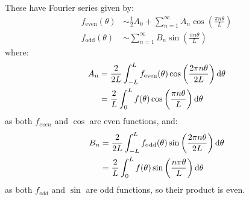 \documentclass[../main.tex]{subfiles}
\begin{document}
These have Fourier series given by:
\begin{align*}
  f_{\text{even}}(\theta) &\sim \frac{1}{2}A_0 + \sum_{n = 1}^{\infty} A_n \cos\left(\frac{\pi n \theta}{L}\right) \\
  f_{\text{odd}}(\theta) &\sim \sum_{n = 1}^{\infty} B_n \sin\left(\frac{\pi n \theta}{L}\right)
\end{align*}
where:
\begin{align*}
  A_n &= \frac{2}{2L} \int_{-L}^{L} f_{\text{even}}(\theta) \cos\left(\frac{2 \pi n \theta}{2L}\right) \d{\theta} \\
      &= \frac{2}{L} \int_{0}^{L} f(\theta) \cos\left(\frac{\pi n \theta}{L}\right) \d{\theta}
\end{align*}
as both $f_{even}$ and $\cos$ are even functions, and:
\begin{align*}
  B_n &= \frac{2}{2L} \int_{-L}^{L} f_{\text{odd}}(\theta) \sin\left(\frac{2 \pi n \theta}{2L}\right) \d{\theta} \\
      &= \frac{2}{L} \int_{0}^{L} f(\theta) \sin\left(\frac{n \pi \theta}{L}\right) \d{\theta}
\end{align*}
as both $f_{odd}$ and $\sin$ are odd functions, so their product is even.
\end{document}
